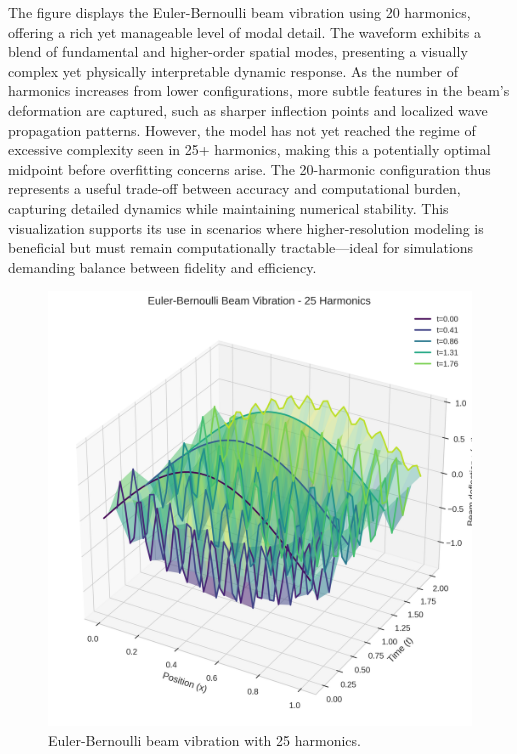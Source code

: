 \documentclass[preprint,12pt]{elsarticle}
\begin{document}
The figure displays the Euler-Bernoulli beam vibration using 20 harmonics, offering a rich yet manageable level of modal detail. The waveform exhibits a blend of fundamental and higher-order spatial modes, presenting a visually complex yet physically interpretable dynamic response. As the number of harmonics increases from lower configurations, more subtle features in the beam’s deformation are captured, such as sharper inflection points and localized wave propagation patterns. However, the model has not yet reached the regime of excessive complexity seen in 25+ harmonics, making this a potentially optimal midpoint before overfitting concerns arise. The 20-harmonic configuration thus represents a useful trade-off between accuracy and computational burden, capturing detailed dynamics while maintaining numerical stability. This visualization supports its use in scenarios where higher-resolution modeling is beneficial but must remain computationally tractable—ideal for simulations demanding balance between fidelity and efficiency.

\begin{figure}[t]
    \centering
    \includegraphics[width=0.9\linewidth]{figures/euler_bernoulli_3d_25h.png}
    \caption{Euler-Bernoulli beam vibration with 25 harmonics.}
    \label{fig:euler_25h}
\end{figure}
\end{document}

